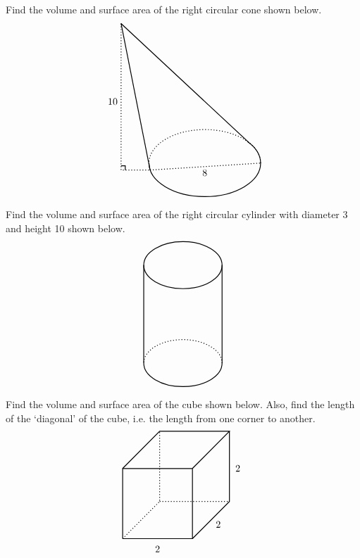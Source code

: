 \documentclass[11pt,letterpaper]{article}
\begin{document}

 Find the volume and surface area of the right circular cone shown below.
	\[
	\begin{tikzpicture}
	\draw[line width=0.03cm] (-1.96,-0.25) -- (-3,5);
	\draw[line width=0.03cm] (1.58,0.735) -- (-3,5);    
	                                                           
	\draw[line width=0.03cm,dotted] (-3,5) -- (-3,-0.25) -- (-1.96,-0.25);
	\draw[line width=0.03cm] (-3,-0.1) -- (-2.85,-0.1) -- (-2.85,-0.25);
	\node at (-3.3,2.2) {$10$};
	
	\draw[line width=0.03cm,dotted] (-1.96,-0.25) -- (2,0);
	\node at (0,-0.35) {$8$};
	
	\draw[line width=0.03cm,dotted] (2, 0) arc [start angle=0, end angle=180, x radius= 2, y radius= 1.2];
	\draw[line width=0.03cm] (-2, 0) arc [start angle=180, end angle=400, x radius= 2, y radius= 1.2];	
	\end{tikzpicture}
	\]



\newpage



 Find the volume and surface area of the right circular cylinder with diameter 3 and height 10 shown below.
	\[
	\begin{tikzpicture}[scale=0.7]
	\draw[line width=0.03cm] (0,5) ellipse (2 and 1.2);
	\draw[line width=0.03cm] (-2,5) -- (-2,0);
	\draw[line width=0.03cm] (2,5) -- (2,0);
	\draw[line width=0.03cm,dotted] (2, 0) arc [start angle=0, end angle=180, x radius= 2, y radius= 1.2];
	\draw[line width=0.03cm] (-2, 0) arc [start angle=180, end angle=360, x radius= 2, y radius= 1.2];
	\end{tikzpicture}
	\]



\newpage



 Find the volume and surface area of the cube shown below. Also, find the length of the `diagonal' of the cube, i.e. the length from one corner to another. 
 	\[
	\begin{tikzpicture}[scale=2.5]
	\draw[line width=0.03cm] (0,0) -- (1,0) -- (1,1) -- (0,1) -- (0,0);
	\draw[line width=0.03cm] (0,1) -- (0.53,1.53) -- (1.53,1.53) -- (1,1);
	\draw[line width=0.03cm] (1.53,1.53) -- (1.53,0.53) -- (1,0);
	\draw[line width=0.03cm, dotted] (0,0) -- (0.53,0.53) -- (0.53,1.53);
	\draw[line width=0.03cm, dotted] (0.53,0.53) -- (1.53,0.53);
	\node at (0.5,-0.15) {$2$};
	\node at (1.37,0.2) {$2$};
	\node at (1.65,1) {$2$};
	\end{tikzpicture}
	\]
\end{document}
